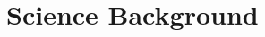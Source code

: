 

\chapter[Science Background]{Science Background}
\label{ch:science_background}

% 




%
%
%
%
%

